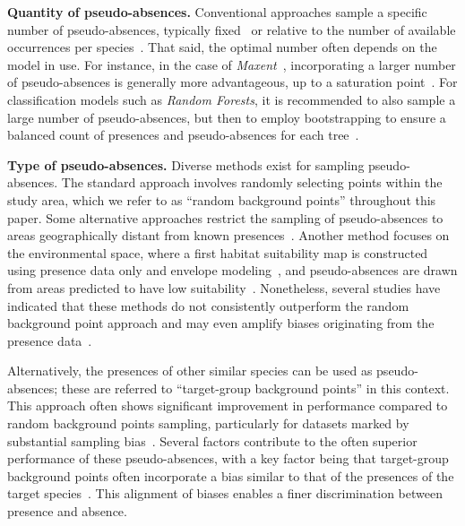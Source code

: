 \documentclass[3p,preprint,12pt]{elsarticle}
\begin{document}
\textbf{Quantity of pseudo-absences.}
Conventional approaches sample a specific number of pseudo-absences, typically fixed~\citep{elith2006novel} or relative to the number of available occurrences per species~\citep{valavi2021modelling}. That said, the optimal number often depends on the model in use. For instance, in the case of \textit{Maxent}~\citep{phillips2006maximum}, incorporating a larger number of pseudo-absences is generally more advantageous, up to a saturation point~\citep{phillips2008modeling}. %
For classification models such as \textit{Random Forests}, it is recommended to also sample a large number of pseudo-absences, but then to employ bootstrapping to ensure a balanced count of presences and pseudo-absences for each tree~\citep{barbet2012selecting, valavi2021modelling}.

\textbf{Type of pseudo-absences.}
Diverse methods exist for sampling pseudo-absences. The standard approach involves randomly selecting points within the study area, which we refer to as ``random background points'' throughout this paper. Some alternative approaches restrict the sampling of pseudo-absences to areas geographically distant from known presences~\citep{mateo2010profile, barbet2012selecting}. Another method focuses on the environmental space, where a first habitat suitability map is constructed using presence data only and envelope modeling~\citep{araujo2012uses}, and pseudo-absences are drawn from areas predicted to have low suitability~\citep{engler2004improved}. Nonetheless, several studies have indicated that these methods do not consistently outperform the random background point approach and may even amplify biases originating from the presence data~\citep{Wisz2009, lyu2022integrated}.

Alternatively, the presences of other similar species can be used as pseudo-absences; these are referred to ``target-group background points'' in this context. This approach often shows significant improvement in performance compared to random background points sampling, particularly for datasets marked by substantial sampling bias~\citep{ponder2001evaluation, phillips2009sample}. Several factors contribute to the often superior performance of these pseudo-absences, with a key factor being that target-group background points often incorporate a bias similar to that of the presences of the target species~\citep{hertzog2014field, botella2020bias}. This alignment of biases enables a finer discrimination between presence and absence. 
\end{document}
